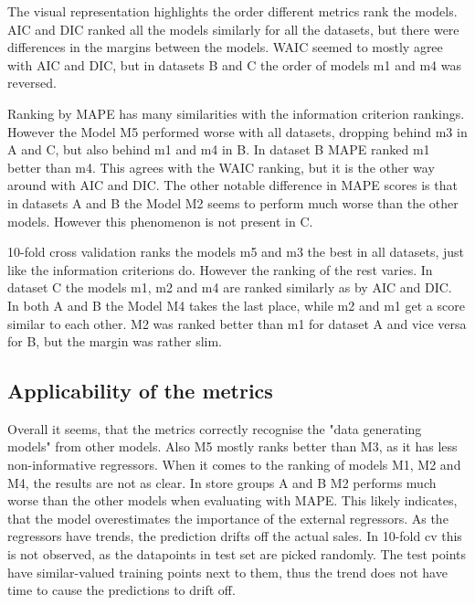 \documentclass[english, 12pt, a4paper, sci, utf8, a-1b, online]{aaltothesis}
\begin{document}
The visual representation highlights the order different metrics rank the models. AIC and DIC ranked all the models similarly for all the datasets, but there were differences in the margins between the models. WAIC seemed to mostly agree with AIC and DIC, but in datasets B and C the order of models m1 and m4 was reversed. 

Ranking by MAPE has many similarities with the information criterion rankings. However the Model M5 performed worse with all datasets, dropping behind m3 in A and C, but also behind m1 and m4 in B. In dataset B MAPE ranked m1 better than m4. This agrees with the WAIC ranking, but it is the other way around with AIC and DIC. The other notable difference in MAPE scores is that in datasets A and B the Model M2 seems to perform much worse than the other models. However this phenomenon is not present in C. 

10-fold cross validation ranks the models m5 and m3 the best in all datasets, just like the information criterions do. However the ranking of the rest varies. In dataset C the models m1, m2 and m4 are ranked similarly as by AIC and DIC. In both A and B the Model M4 takes the last place, while m2 and m1 get a score similar to each other. M2 was ranked better than m1 for dataset A and vice versa for B, but the margin was rather slim.


\subsection{Applicability of the metrics}


Overall it seems, that the metrics correctly recognise the "data generating models" from other models. Also M5 mostly ranks better than M3, as it has less non-informative regressors. When it comes to the ranking of models M1, M2 and M4, the results are not as clear. In store groups A and B M2 performs much worse than the other models when evaluating with MAPE. This likely indicates, that the model overestimates the importance of the external regressors. As the regressors have trends, the prediction drifts off the actual sales. In 10-fold cv this is not observed, as the datapoints in test set are picked randomly. The test points have similar-valued training points next to them, thus the trend does not have time to cause the predictions to drift off.
\end{document}
